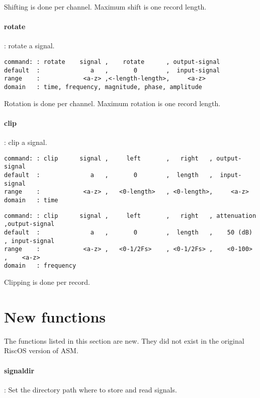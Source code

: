\documentclass{report}
\newcommand{\bc}{\scriptsize}
\newcommand{\ec}{\normalsize}
\begin{document}
Shifting is done per channel.
Maximum shift is one record length.

\paragraph{rotate}: rotate a signal.

\bc
\begin{verbatim}
command: : rotate    signal ,    rotate      , output-signal
default  :              a   ,       0        ,  input-signal
range    :            <a-z> ,<-length-length>,     <a-z>
domain   : time, frequency, magnitude, phase, amplitude
\end{verbatim}
\ec

Rotation is done per channel.
Maximum rotation is one record length.

\paragraph{clip}: clip a signal.

\bc
\begin{verbatim}
command: : clip      signal ,     left       ,   right   , output-signal
default  :              a   ,       0        ,  length   ,  input-signal
range    :            <a-z> ,   <0-length>   , <0-length>,     <a-z>
domain   : time
\end{verbatim}
\ec

\bc
\begin{verbatim}
command: : clip      signal ,     left       ,   right   , attenuation ,output-signal
default  :              a   ,       0        ,  length   ,    50 (dB)  , input-signal
range    :            <a-z> ,   <0-1/2Fs>    , <0-1/2Fs> ,    <0-100>  ,    <a-z>
domain   : frequency
\end{verbatim}
\ec

Clipping is done per record.


\section{New functions}

The functions listed in this section are new. They did not exist in
the original RiscOS version of ASM.

\paragraph{signaldir}: Set the directory path where to store and read signals.
\end{document}
